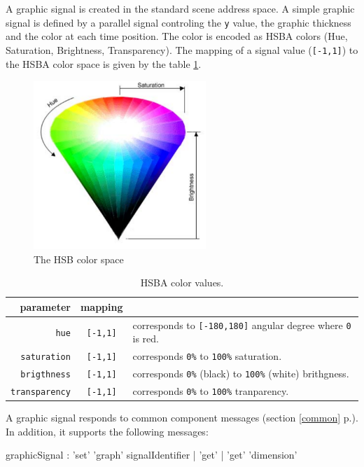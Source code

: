 \documentclass[a4paper,twoside]{report}
\newcommand{\fullref}[1]	{\ref{#1} p.\pageref{#1}}
\newcommand{\OSC}[1]		{\texttt{#1}}
\newcommand{\values}[1]	{\texttt{#1}}
\begin{document}
A graphic signal is created in the standard scene address space. A simple graphic signal is defined by a parallel signal controling the \values{y} value, the graphic thickness and the color at each time position. The color is encoded as HSBA colors (Hue, Saturation, Brightness, Transparency). The mapping of a signal value  (\values{[-1,1]}) to the HSBA color space is given by the table \ref{hsbamap}. 

\begin{figure}[h]
	\centering \includegraphics[width=65mm]{imgs/hsb}
 \caption{The HSB color space}
 \label{hsbfiug}
\end{figure}


\begin{table}[htdp]
\caption{HSBA color values.}
\begin{center}
\begin{tabular}{|r|cl|}
\hline
parameter & mapping & \\
\hline
\OSC{hue}				& \OSC{[-1,1]} & corresponds to \OSC{[-180,180]} angular degree where \OSC{0} is red. \\
\OSC{saturation}		& \OSC{[-1,1]} & corresponds \OSC{0\%} to \OSC{100\%} saturation. \\
\OSC{brigthness}		& \OSC{[-1,1]} & corresponds \OSC{0\%} (black) to \OSC{100\%} (white) brithgness. \\
\OSC{transparency}		& \OSC{[-1,1]} & corresponds \OSC{0\%} to \OSC{100\%} tranparency. \\
\hline
\end{tabular}
\end{center}
\label{hsbamap}
\end{table}



A graphic signal responds to common component messages (section \fullref{common}). In addition, it supports the following messages:
\begin{rail}
graphicSignal : 'set' 'graph' signalIdentifier 
			| 'get'
			| 'get' 'dimension'
\end{rail}
\end{document}

